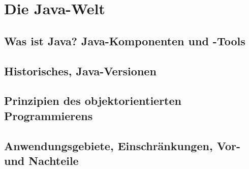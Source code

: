 
\chapter{Die Java-Welt}
\section{Was ist Java? Java-Komponenten und -Tools}



\section{Historisches, Java-Versionen}

\section{Prinzipien des objektorientierten Programmierens}

\section{Anwendungsgebiete, Einschränkungen, Vor- und Nachteile}

